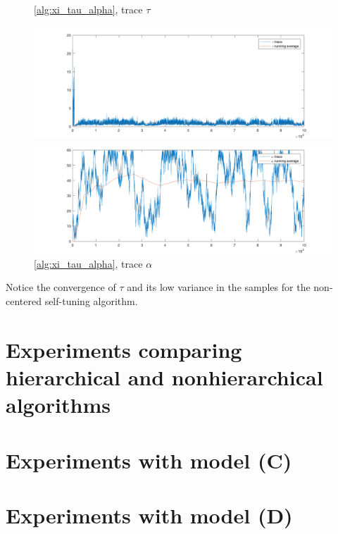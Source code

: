 \documentclass{siamart1116}
\begin{document}
    \begin{figure}[!htb]
        \begin{minipage}{0.48\textwidth}
            \centering
            \caption{\label{fig:moon_noncentered_tau} \cref{alg:xi_tau_alpha}, trace $\tau$}
            \includegraphics[width=\linewidth]{graphics/moons/noncentered/trace_tau.png}
        \end{minipage} \hfill
        \begin{minipage}{0.48\textwidth}
            \centering
            \caption{\label{fig:moon_noncentered_alpha} \cref{alg:xi_tau_alpha}, trace $\alpha$}
            \includegraphics[width=\linewidth]{graphics/moons/noncentered/trace_alpha.png}
        \end{minipage}
    \end{figure}

    Notice the convergence of $\tau$ and its low variance in the samples for the non-centered self-tuning algorithm.

\section{Experiments comparing hierarchical and nonhierarchical algorithms}

\section{Experiments with model (C)}

\section{Experiments with model (D)}



\end{document}
